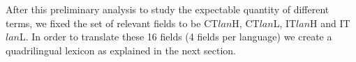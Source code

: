 \documentclass[a4paper,11pt]{article}
\newcommand{\red}[1]{\textcolor{red}{#1}}
\newcommand{\mc}[3]{\multicolumn{#1}{#2}{#3}}
\begin{document}
	After this preliminary analysis to study the expectable quantity of different terms, we fixed the set of  relevant fields to be CT$lan$H, CT$lan$L, IT$lan$H and IT$lan$L. In order to translate these 16 fields (4 fields per language) we create a quadrilingual lexicon as explained in the next section.
	
\end{document}
